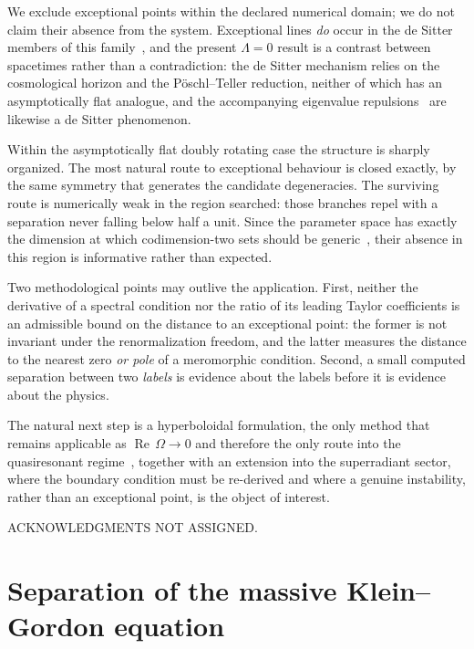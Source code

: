 \documentclass[aps,prd,reprint,superscriptaddress,nofootinbib,longbibliography]{revtex4-2}
\theoremstyle{plain}
\theoremstyle{definition}
\theoremstyle{remark}
\newcommand{\Rem}{\operatorname{Re}}
\begin{document}
We exclude exceptional points within the declared numerical domain; we do not
claim their absence from the system. Exceptional lines \emph{do} occur in the de
Sitter members of this family~\cite{Nakamoto2026A17}, and the present
$\Lambda=0$ result is a contrast between spacetimes rather than a contradiction:
the de Sitter mechanism relies on the cosmological horizon and the
P\"oschl--Teller reduction, neither of which has an asymptotically flat
analogue, and the accompanying eigenvalue
repulsions~\cite{Daveyetal2022A13} are likewise a de Sitter phenomenon.

Within the asymptotically flat doubly rotating case the structure is sharply
organized. The most natural route to exceptional behaviour is closed exactly, by
the same symmetry that generates the candidate degeneracies. The surviving route
is numerically weak in the region searched: those branches repel with a
separation never falling below half a unit. Since the parameter space has
exactly the dimension at which codimension-two sets should be
generic~\cite{Bergholtz2019E63}, their absence in this region is informative
rather than expected.

Two methodological points may outlive the application. First, neither the
derivative of a spectral condition nor the ratio of its leading Taylor
coefficients is an admissible bound on the distance to an exceptional point: the
former is not invariant under the renormalization freedom, and the latter
measures the distance to the nearest zero \emph{or pole} of a meromorphic
condition. Second, a small computed separation between two \emph{labels} is
evidence about the labels before it is evidence about the physics.

The natural next step is a hyperboloidal formulation, the only method that
remains applicable as $\Rem\,\Omega\to0$ and therefore the only route into the
quasiresonant regime~\cite{Jaramillo2020C36,PanossoMacedoetal2025B30}, together
with an extension into the superradiant sector, where the boundary condition
must be re-derived and where a genuine instability, rather than an exceptional
point, is the object of interest.

\begin{acknowledgments}
ACKNOWLEDGMENTS NOT ASSIGNED.
\end{acknowledgments}

\appendix

\section{Separation of the massive Klein--Gordon equation}\label{app:sep}
\end{document}
